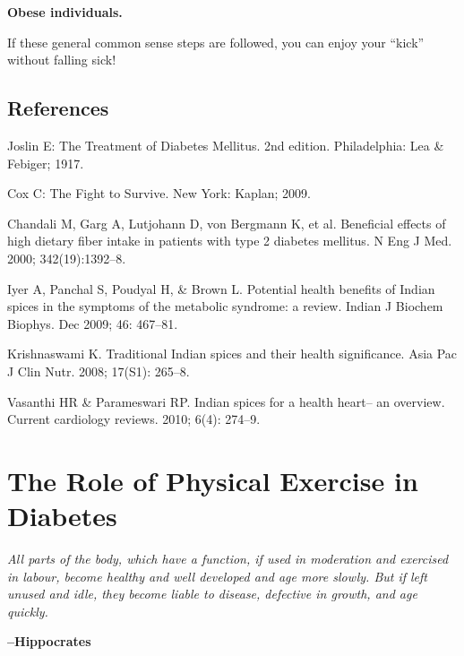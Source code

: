  \item 
 \textbf{Obese individuals.}

 If these general common sense steps are followed, you can enjoy your “kick” without falling sick!



\section*{References}

\begin{thebibliography}{99}
 Joslin E: The Treatment of Diabetes Mellitus. 2nd edition. Philadelphia: Lea \& Febiger; 1917.

  Cox C: The Fight to Survive. New York: Kaplan; 2009.

  Chandali M, Garg A, Lutjohann D, von Bergmann K, et al. Beneficial effects of high dietary fiber intake in patients with type 2 diabetes mellitus. N Eng J Med. 2000; 342(19):1392–8.

  Iyer A, Panchal S, Poudyal H, \& Brown L. Potential health benefits of Indian spices in the symptoms of the metabolic syndrome: a review. Indian J Biochem Biophys. Dec 2009; 46: 467–81.

  Krishnaswami K. Traditional Indian spices and their health significance. Asia Pac J Clin Nutr. 2008; 17(S1): 265–8.

  Vasanthi HR \& Parameswari RP. Indian spices for a health heart– an overview. Current cardiology reviews. 2010; 6(4): 274–9.

 \end{thebibliography}


\chapter{The Role of Physical Exercise in Diabetes}

\begin{myquote}
\textit{All parts of the body, which have a function, if used in moderation and exercised in labour, become healthy and well developed and age more slowly. But if left unused and idle, they become liable to disease, defective in growth, and age quickly.} 
\begin{flushright}
\textbf{–Hippocrates}
\end{flushright}
\end{myquote}

